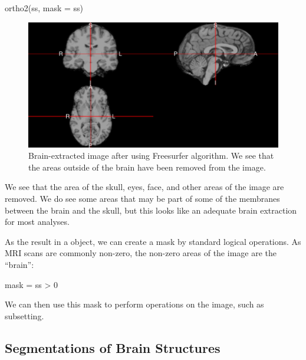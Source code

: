 \begin{Schunk}
\begin{Sinput}
ortho2(ss, mask = ss)
\end{Sinput}
\end{Schunk}\begin{Schunk}
\begin{figure}
\includegraphics{Freesurfer_files/figure-latex/watershed_plot-1} \caption[Brain-extracted image after using Freesurfer  algorithm]{Brain-extracted image after using Freesurfer  algorithm.  We see that the areas outside of the brain have been removed from the image.}\label{fig:watershed_plot}
\end{figure}
\end{Schunk}

We see that the area of the skull, eyes, face, and other areas of the
image are removed. We do see some areas that may be part of some of the
membranes between the brain and the skull, but this looks like an
adequate brain extraction for most analyses.

As the result in a  object, we can create a mask by standard
logical operations. As MRI scans are commonly non-zero, the non-zero
areas of the image are the ``brain'':

\begin{Schunk}
\begin{Sinput}
mask = ss > 0
\end{Sinput}
\end{Schunk}

We can then use this mask to perform operations on the image, such as
subsetting.

\subsection{Segmentations of Brain
Structures}\label{segmentations-of-brain-structures}

